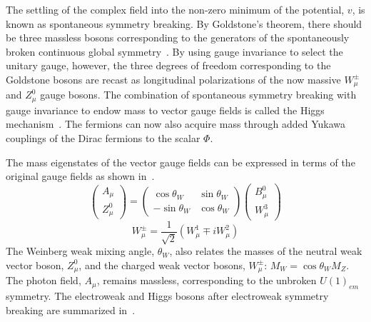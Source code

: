 The settling of the complex field into the non-zero minimum of the potential, $v$, is known as spontaneous symmetry breaking. By Goldstone's theorem, there should be three massless bosons corresponding to the generators of the spontaneously broken continuous global symmetry~\cite{Goldstone,gold_salam_wein}. By using gauge invariance to select the unitary gauge, however, the three degrees of freedom corresponding to the Goldstone bosons are recast as longitudinal polarizations of the now massive $W^{\pm}_{\mu}$ and $Z_{\mu}^0$ gauge bosons. The combination of spontaneous symmetry breaking with gauge invariance to endow mass to vector gauge fields is called the Higgs mechanism~\cite{brout_englert,higgs_mech,gur_hag_kib}. The fermions can now also acquire mass through added Yukawa couplings of the Dirac fermions to the scalar $\Phi$.

The mass eigenstates of the vector gauge fields can be expressed in terms of the original gauge fields as shown in~\Eqns{\ref{eq:az_mix}}{\ref{eq:w_mix}}.
\begin{equation}
\begin{pmatrix}A_{\mu}\\Z_{\mu}^0\end{pmatrix}  =  \begin{pmatrix}\cos\theta_W&\sin\theta_W\\-\sin\theta_W&\cos\theta_W\end{pmatrix}\begin{pmatrix}B^0_{\mu}\\W^3_{\mu}\end{pmatrix}
\label{eq:az_mix}
\end{equation}
\begin{equation}
\label{eq:w_mix}
W^{\pm}_{\mu} = \frac{1}{\sqrt{2}}\left(W^1_{\mu}\mp iW^2_{\mu}\right)
\end{equation}
The Weinberg weak mixing angle, $\theta_W$, also relates the masses of the neutral weak vector boson, $Z_{\mu}^0$, and the charged weak vector bosons, $W^{\pm}_{\mu}$: $M_W=\cos\theta_WM_Z$. The photon field, $A_{\mu}$, remains massless, corresponding to the unbroken $U(1)_{em}$ symmetry. The electroweak and Higgs bosons after electroweak symmetry breaking are summarized in~\Tab{\ref{tab:ew_bosons}}.

